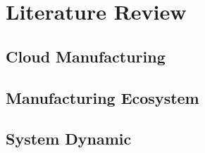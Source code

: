 \section{Literature Review} %
\label{sec:literature_review}

\subsection{Cloud Manufacturing} %
\label{sub:cloud_manufacturing}


\subsection{Manufacturing Ecosystem} %
\label{sub:manufacturing_ecosystem}


\subsection{System Dynamic} %
\label{sub:system_dynamic}


